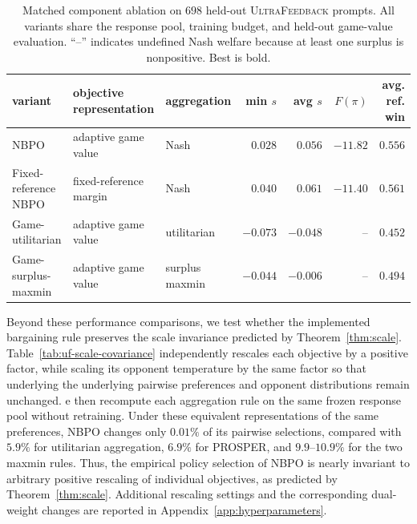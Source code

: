 \documentclass{article}
\theoremstyle{remark}
\theoremstyle{plain}
\newcommand{\NBPO}{\textsc{NBPO}}
\begin{document}
\begin{table}[t]
\centering\footnotesize
\setlength{\tabcolsep}{2.2pt}
\caption{Matched component ablation on $698$ held-out \textsc{UltraFeedback} prompts. All variants share the response pool, training budget, and held-out game-value evaluation. ``--'' indicates undefined Nash welfare because at least one surplus is nonpositive. Best is bold.}
\label{tab:component-ablation}
\begin{tabular}{lllrrrr}
\toprule
variant & objective representation & aggregation & min $s$ & avg $s$ & $F(\pi)$ & avg. ref. win \\
\midrule
\NBPO{} & adaptive game value & Nash & $0.028$ & $0.056$ & $-11.82$ & $0.556$ \\
Fixed-reference NBPO & fixed-reference margin & Nash & $\mathbf{0.040}$ & $\mathbf{0.061}$ & $\mathbf{-11.40}$ & $\mathbf{0.561}$ \\
Game-utilitarian & adaptive game value & utilitarian & $-0.073$ & $-0.048$ & -- & $0.452$ \\
Game-surplus-maxmin & adaptive game value & surplus maxmin & $-0.044$ & $-0.006$ & -- & $0.494$ \\
\bottomrule
\end{tabular}
\end{table}

Beyond these performance comparisons, we test whether the implemented bargaining rule preserves the scale invariance predicted by Theorem~\ref{thm:scale}. Table~\ref{tab:uf-scale-covariance} independently rescales each objective by a positive factor, while scaling its opponent temperature by the same factor so that underlying the underlying pairwise preferences and opponent distributions remain unchanged. e then recompute each aggregation rule on the same frozen response
pool without retraining. Under these equivalent representations of the same preferences, \NBPO{} changes only $0.01\%$ of its pairwise selections, compared with $5.9\%$ for utilitarian aggregation, $6.9\%$ for PROSPER, and $9.9$--$10.9\%$ for the two maxmin rules. Thus, the empirical policy selection of \NBPO{} is nearly invariant to arbitrary positive rescaling of individual objectives, as predicted by Theorem~\ref{thm:scale}. Additional rescaling settings and the corresponding dual-weight changes are reported in Appendix~\ref{app:hyperparameters}.
\end{document}
